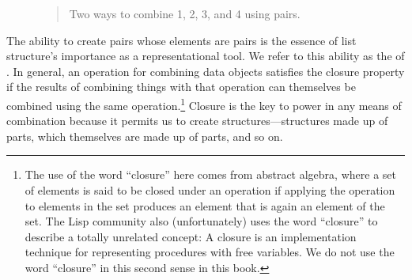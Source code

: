 \begin{figure}[tb]
\label{Figure 2.3}
\centering

\begin{quote}
 Two ways to combine 1, 2, 3, and 4 using pairs.
\end{quote}
\end{figure}

The ability to create pairs whose elements are pairs is the essence of list
structure's importance as a representational tool.  We refer to this ability as
the  of .  In general, an operation for
combining data objects satisfies the closure property if the results of
combining things with that operation can themselves be combined using the same
operation.\footnote{The use of the word ``closure'' here comes from abstract
algebra, where a set of elements is said to be closed under an operation if
applying the operation to elements in the set produces an element that is again
an element of the set.  The Lisp community also (unfortunately) uses the word
``closure'' to describe a totally unrelated concept: A closure is an
implementation technique for representing procedures with free variables.  We
do not use the word ``closure'' in this second sense in this book.  } Closure
is the key to power in any means of combination because it permits us to create
 structures---structures made up of parts, which
themselves are made up of parts, and so on.

